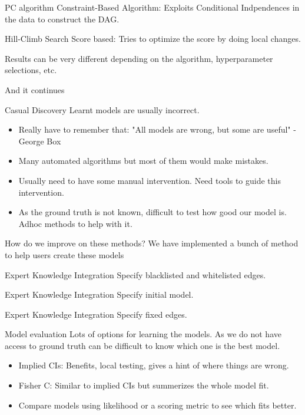 \documentclass{beamer}
\begin{document}
\begin{frame}{PC algorithm}
	Constraint-Based Algorithm: Exploits Conditional Indpendences in the data to construct the DAG.
\end{frame}

\begin{frame}{Hill-Climb Search}
	Score based: Tries to optimize the score by doing local changes.

	Results can be very different depending on the algorithm, hyperparameter selections, etc.
\end{frame}

\begin{frame}{And it continues}
\end{frame}

\begin{frame}{Casual Discovery}
	Learnt models are usually incorrect.
	\begin{itemize}
		\item Really have to remember that: "All models are wrong, but some are useful" - George Box
		\item Many automated algorithms but most of them would make mistakes.
		\item Usually need to have some manual intervention. Need tools to guide this intervention.
		\item As the ground truth is not known, difficult to test how good our model is. Adhoc methods to help with it.
	\end{itemize}
	How do we improve on these methods?
	We have implemented a bunch of method to help users create these models
\end{frame}

\begin{frame}{Expert Knowledge Integration}
	Specify blacklisted and whitelisted edges.
\end{frame}

\begin{frame}{Expert Knowledge Integration} 
	Specify initial model.
\end{frame}

\begin{frame}{Expert Knowledge Integration}
	Specify fixed edges.
\end{frame}

\begin{frame}{Model evaluation}
	Lots of options for learning the models. As we do not have access to ground truth
	can be difficult to know which one is the best model.
	\begin{itemize}
		\item Implied CIs: Benefits, local testing, gives a hint of where things are wrong.
		\item Fisher C: Similar to implied CIs but summerizes the whole model fit.
		\item Compare models using likelihood or a scoring metric to see which fits better.
	\end{itemize}
\end{frame}
\end{document}
